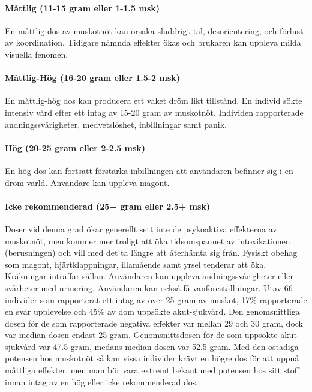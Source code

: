 \paragraph{Måttlig (11-15 gram eller 1-1.5 msk)}
En måttlig dos av muskotnöt kan orsaka sluddrigt tal, desorientering, och förlust av koordination. Tidigare nämnda effekter ökas och brukaren kan uppleva milda visuella fenomen.

\paragraph{Måttlig-Hög (16-20 gram eller 1.5-2 msk)}
En måttlig-hög dos kan producera ett vaket dröm likt tillstånd. En individ sökte intensiv vård efter ett intag av 15-20 gram av muskotnöt. Individen rapporterade andningssvårigheter, medvetslöshet, inbillningar samt panik.

\paragraph{Hög (20-25 gram eller 2-2.5 msk)}
En hög dos kan fortsatt förstärka inbillningen att användaren befinner sig i en dröm värld. Användare kan uppleva magont.

\paragraph{Icke rekommenderad (25+ gram eller 2.5+ msk)}
Doser vid denna grad ökar generellt sett inte de psykoaktiva effekterna av muskotnöt, men kommer mer troligt att öka tidsomspannet av intoxikationen (berusningen) och vill med det ta längre att återhämta sig från.
Fysiskt obehag som magont, hjärtklappningar, illamående samt yrsel tenderar att öka.
Kräkningar inträffar sällan.
Användaren kan uppleva andningssvårigheter eller svårheter med urinering. Användaren kan också få vanföreställningar.
Utav 66 individer som rapporterat ett intag av över 25 gram av muskot, 17\% rapporterade en svår upplevelse och 45\% av dom uppsökte akut-sjukvård.
Den genomsnittliga dosen för de som rapporterade negativa effekter var mellan 29 och 30 gram, dock var median dosen endast 25 gram. Genomsnittsdosen för de som uppsökte akut-sjukvård var 47.5 gram, medans median dosen var 52.5 gram. Med den ostadiga potensen hos muskotnöt så kan vissa individer krävt en högre dos för att uppnå måttliga effekter, men man bör vara extremt bekant med potensen hos sitt stoff innan intag av en hög eller icke rekommenderad dos.









